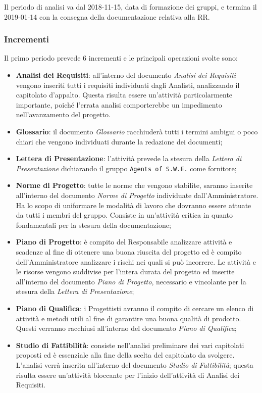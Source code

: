 Il periodo di analisi va dal 2018-11-15, data di formazione dei gruppi, e termina il 2019-01-14 con la consegna della documentazione relativa alla RR.

\newpage
\subsubsection{Incrementi}

Il primo periodo prevede 6 incrementi e le principali operazioni svolte sono: 
\begin{itemize}
	\item \textbf{Analisi dei Requisiti}: all'interno del documento \textit{Analisi dei Requisiti} vengono inseriti tutti i requisiti individuati dagli Analisti, analizzando il capitolato d'appalto. Questa risulta essere un'attività particolarmente importante, poiché l'errata analisi comporterebbe un impedimento nell'avanzamento del progetto.
	\item \textbf{Glossario}: il documento \textit{Glossario} racchiuderà tutti i termini ambigui o poco chiari che vengono individuati durante la redazione dei documenti;
	\item \textbf{Lettera di Presentazione}: l'attività prevede la stesura della \textit{Lettera di Presentazione} dichiarando il gruppo \texttt{Agents of S.W.E.} come fornitore;
	\item \textbf{Norme di Progetto}: tutte le norme che vengono stabilite, saranno inserite all'interno del documento \textit{Norme di Progetto} individuate dall'Amministratore. Ha lo scopo di uniformare le modalità di lavoro che dovranno essere attuate da tutti i membri del gruppo. Consiste in un'attività critica in quanto fondamentali per la stesura della documentazione;
	\item \textbf{Piano di Progetto}: è compito del Responsabile analizzare attività e scadenze al fine di ottenere una buona riuscita del progetto ed è compito dell'Amministratore analizzare i rischi nei quali si può incorrere. Le attività e le risorse vengono suddivise per l'intera durata del progetto ed inserite all'interno del documento \textit{Piano di Progetto}, necessario e vincolante per la stesura della \textit{Lettera di Presentazione};
	\item \textbf{Piano di Qualifica}: i Progettisti avranno il compito di cercare un elenco di attività e metodi utili al fine di garantire una buona qualità di prodotto. Questi verranno racchiusi all'interno del documento \textit{Piano di Qualifica};
	\item \textbf{Studio di Fattibilità}: consiste nell'analisi preliminare dei vari capitolati proposti ed è essenziale alla fine della scelta del capitolato da svolgere. L'analisi verrà inserita all'interno del documento \textit{Studio di Fattibilità}; questa risulta essere un'attività bloccante per l'inizio dell'attività di Analisi dei Requisiti.  
\end{itemize}

